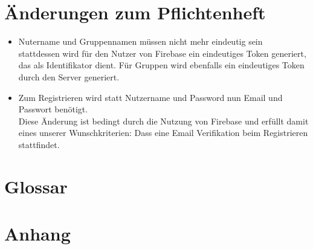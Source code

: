 \documentclass[a4paper]{scrreprt}
\begin{document}
\chapter{Änderungen zum Pflichtenheft}
\begin{itemize}
	\item Nutername und Gruppennamen müssen nicht mehr eindeutig sein \\
	stattdessen wird für den Nutzer von Firebase ein eindeutiges Token generiert, das als Identifikator dient. Für Gruppen wird ebenfalls ein eindeutiges Token durch den Server generiert.
	\item Zum Registrieren wird statt Nutzername und Password nun Email und Passwort benötigt. \\Diese Änderung ist bedingt durch die Nutzung von Firebase und erfüllt damit eines unserer Wunschkriterien: Dass eine Email Verifikation beim Registrieren stattfindet. 
\end{itemize}

\chapter{Glossar}

\chapter{Anhang}
\end{document}
